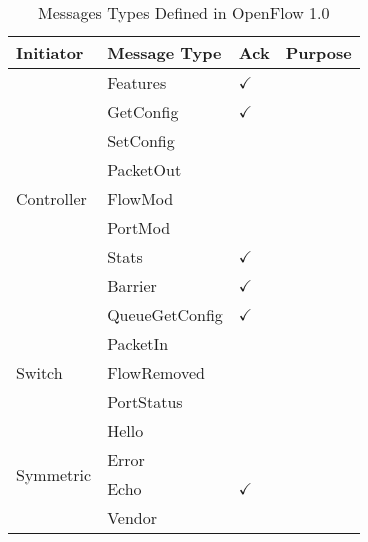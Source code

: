 \begin{table}
\centering
\caption{Messages Types Defined in OpenFlow 1.0}%
\begin{tabular}{llll}
\toprule
Initiator                   & Message Type   & Ack          & Purpose \\ \midrule
\multirow{9}{*}{Controller} & Features       & $\checkmark$ &         \\
                            & GetConfig      & $\checkmark$ &         \\
                            & SetConfig      &              &         \\
                            & PacketOut      &              &         \\
                            & FlowMod        &              &         \\
                            & PortMod        &              &         \\
                            & Stats          & $\checkmark$ &         \\
                            & Barrier        & $\checkmark$ &         \\
                            & QueueGetConfig & $\checkmark$ &         \\ \midrule
\multirow{3}{*}{Switch}     & PacketIn       &              &         \\
                            & FlowRemoved    &              &         \\
                            & PortStatus     &              &         \\ \midrule
\multirow{4}{*}{Symmetric}  & Hello          &              &         \\
                            & Error          &              &         \\
                            & Echo           & $\checkmark$ &         \\
                            & Vendor         &              &         \\ \bottomrule
\end{tabular}
\end{table}

